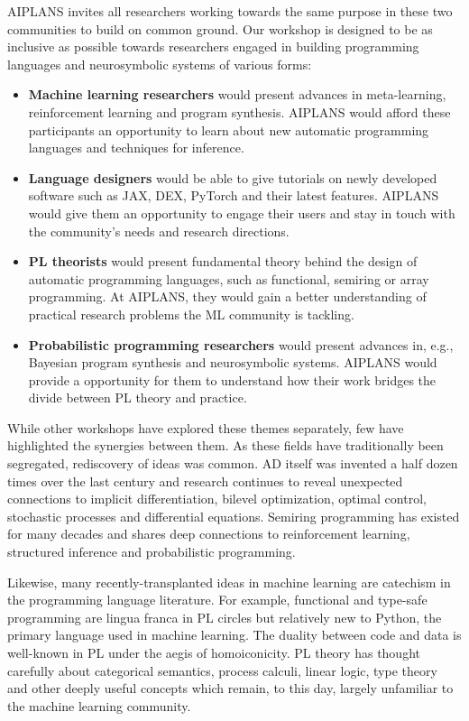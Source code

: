 \documentclass{article}
\begin{document}
    AIPLANS invites all researchers working towards the same purpose in these two communities to build on common ground. Our workshop is designed to be as inclusive as possible towards researchers engaged in building programming languages and neurosymbolic systems of various forms:
    \begin{itemize}
        \item \textbf{Machine learning researchers} would present advances in meta-learning, reinforcement learning and program synthesis. AIPLANS would afford these participants an opportunity to learn about new automatic programming languages and techniques for inference.
        \item \textbf{Language designers} would be able to give tutorials on newly developed software such as JAX, DEX, PyTorch and their latest features. AIPLANS would give them an opportunity to engage their users and stay in touch with the community's needs and research directions.
        \item \textbf{PL theorists} would present fundamental theory behind the design of automatic programming languages, such as functional, semiring or array programming. At AIPLANS, they would gain a better understanding of practical research problems the ML community is tackling.
        \item \textbf{Probabilistic programming researchers} would present advances in, e.g., Bayesian program synthesis and neurosymbolic systems. AIPLANS would provide a opportunity for them to understand how their work bridges the divide between PL theory and practice.
    \end{itemize}

    While other workshops have explored these themes separately, few have highlighted the synergies between them. As these fields have traditionally been segregated, rediscovery of ideas was common. AD itself was invented a half dozen times over the last century and research continues to reveal unexpected connections to implicit differentiation, bilevel optimization, optimal control, stochastic processes and differential equations.  Semiring programming has existed for many decades and shares deep connections to reinforcement learning, structured inference and probabilistic programming.

    Likewise, many recently-transplanted ideas in machine learning are catechism in the programming language literature.  For example, functional and type-safe programming are lingua franca in PL circles but relatively new to Python, the primary language used in machine learning.  The duality between code and data is well-known in PL under the aegis of homoiconicity. PL theory has thought carefully about categorical semantics, process calculi, linear logic, type theory and other deeply useful concepts which remain, to this day, largely unfamiliar to the machine learning community.
\end{document}

